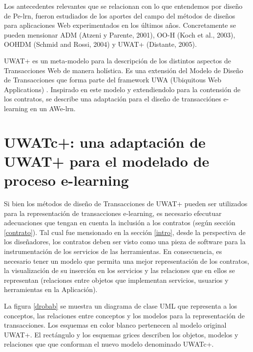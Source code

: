 \documentclass[12 pt,a4paper]{llncs}
\begin{document}
Los antecedentes relevantes que se relacionan con lo que entendemos por diseño de Pe-lrn, fueron estudiados de los aportes del campo del métodos de diseños para aplicaciones Web experimentados en los últimos años. Concretamente se pueden mensionar ADM (Atzeni y Parente, 2001), OO-H (Koch et al., 2003), OOHDM (Schmid and Rossi, 2004) y UWAT+ (Distante, 2005).

UWAT+ es un meta-modelo para la descripción de los distintos aspectos de Transacciones Web de manera holística. Es una extensión del Modelo de Diseño de Transacciones que forma  parte del framework UWA (Ubiquitous Web Applications) \cite{UWA}. Inspirado en este modelo y extendiendolo para la contensión de los contratos, se describe una adaptación para el diseño de transacciónes e-learning en un AWe-lrn.

\section {UWATc+: una adaptación de UWAT+ para el modelado de proceso e-learning} \label{uwatc}

Si bien los métodos de diseño de Transacciones de UWAT+ pueden ser utilizados para la representación de transacciones e-learning, es necesario efecutuar adecuaciones que tengan en cuenta la inclusión a los contratos (según sección \ref{contrato}). Tal cual fue mensionado en la sección \ref{intro}, desde la perspectiva de los diseñadores, los contratos deben ser visto como una pieza de software para la instrumentación de los servicios de las herramientas. En consecuencia, es necesario tener un modelo que permita una mejor representación de los contratos, la visualización de su inserción en los servicios y las relaciones que en ellos se representan (relaciones entre objetos que implementan servicios, usuarios y herramientas en la Aplicación). 


La figura \ref{drobab} se muestra un diagrama de clase UML que representa a los conceptos, las relaciones entre conceptos y los modelos para la representación de transacciones. Los esquemas en color blanco pertenecen al modelo original UWAT+. El rectángulo y los esquemas grices describen los objetos, modelos y relaciones que  que conforman el nuevo modelo denominado UWATc+.
\end{document}
